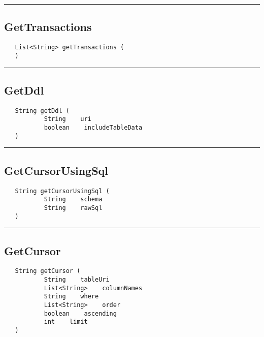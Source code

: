 \rule{15cm}{2pt}
\subsection{GetTransactions}
\label{Api:GetTransactions}
\begin{verbatim}
   List<String> getTransactions (
   )
\end{verbatim}



\rule{15cm}{2pt}
\subsection{GetDdl}
\label{Api:GetDdl}
\begin{verbatim}
   String getDdl (
           String    uri
           boolean    includeTableData
   )
\end{verbatim}



\rule{15cm}{2pt}
\subsection{GetCursorUsingSql}
\label{Api:GetCursorUsingSql}
\begin{verbatim}
   String getCursorUsingSql (
           String    schema
           String    rawSql
   )
\end{verbatim}



\rule{15cm}{2pt}
\subsection{GetCursor}
\label{Api:GetCursor}
\begin{verbatim}
   String getCursor (
           String    tableUri
           List<String>    columnNames
           String    where
           List<String>    order
           boolean    ascending
           int    limit
   )
\end{verbatim}



